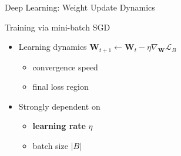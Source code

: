 \begin{frame}{Deep Learning: Weight Update Dynamics}
\protect\hypertarget{deep-learning-weight-update-dynamics}{}
\begin{block}{Training via mini-batch SGD}
\protect\hypertarget{training-via-mini-batch-sgd-2}{}
\begin{itemize}
\tightlist
\item
  Learning dynamics
  \(\mathbf{W}_{t+1} \leftarrow \mathbf{W}_t - \eta \nabla_\mathbf{W} \mathcal{L}_B\)

  \begin{itemize}
  \tightlist
  \item
    convergence speed
  \item
    final loss region
  \end{itemize}
\item
  Strongly dependent on

  \begin{itemize}
  \tightlist
  \item
    \textbf{learning rate} \(\eta\)
  \item
    batch size \(\vert B \vert\)
  \end{itemize}
\end{itemize}
\end{block}

\end{frame}

